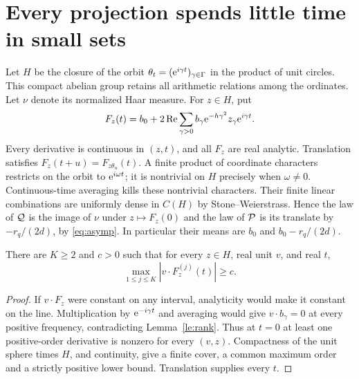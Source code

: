 \section{Every projection spends little time in small sets}
Let \(H\) be the closure of the orbit \(\theta_t=(\mathrm e^{i\gamma t})_{\gamma\in\Gamma}\) in the product of unit circles. This compact abelian group retains all arithmetic relations among the ordinates. Let \(\nu\) denote its normalized Haar measure. For \(z\in H\), put
\[
 F_z(t)=b_0+2\operatorname{Re}\sum_{\gamma>0}
                 b_\gamma\mathrm e^{-h\gamma^2}z_\gamma\mathrm e^{i\gamma t}.
\]
Every derivative is continuous in \((z,t)\), and all \(F_z\) are real analytic. Translation satisfies \(F_z(t+u)=F_{z\theta_u}(t)\). A finite product of coordinate characters restricts on the orbit to \(\mathrm e^{i\omega t}\); it is nontrivial on \(H\) precisely when \(\omega\ne0\). Continuous-time averaging kills these nontrivial characters. Their finite linear combinations are uniformly dense in \(C(H)\) by Stone--Weierstrass. Hence the law of \(\mathcal Q\) is the image of \(\nu\) under \(z\mapsto F_z(0)\) and the law of \(\mathcal P\) is its translate by \(-r_q/(2d)\), by \eqref{eq:asymp}. In particular their means are \(b_0\) and \(b_0-r_q/(2d)\).

\begin{lemma}\label{le:type}
There are \(K\ge2\) and \(c>0\) such that for every \(z\in H\), real unit \(v\), and real \(t\),
\[
 \max_{1\le j\le K}|v\cdot F_z^{(j)}(t)|\ge c .
\]
\end{lemma}
\begin{proof}
If \(v\cdot F_z\) were constant on any interval, analyticity would make it constant on the line. Multiplication by \(\mathrm e^{-i\gamma t}\) and averaging would give \(v\cdot b_\gamma=0\) at every positive frequency, contradicting Lemma~\ref{le:rank}. Thus at \(t=0\) at least one positive-order derivative is nonzero for every \((v,z)\). Compactness of the unit sphere times \(H\), and continuity, give a finite cover, a common maximum order and a strictly positive lower bound. Translation supplies every \(t\).
\end{proof}

